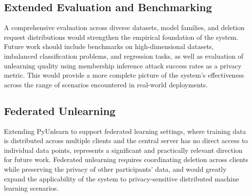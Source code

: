 \subsection{Extended Evaluation and Benchmarking}
A comprehensive evaluation across diverse datasets, model families, and deletion request distributions would strengthen the empirical foundation of the system. Future work should include benchmarks on high-dimensional datasets, imbalanced classification problems, and regression tasks, as well as evaluation of unlearning quality using membership inference attack success rates \cite{shokri2017membership} as a privacy metric. This would provide a more complete picture of the system's effectiveness across the range of scenarios encountered in real-world deployments.

\subsection{Federated Unlearning}
Extending PyUnlearn to support federated learning settings, where training data is distributed across multiple clients and the central server has no direct access to individual data points, represents a significant and practically relevant direction for future work. Federated unlearning requires coordinating deletion across clients while preserving the privacy of other participants' data, and would greatly expand the applicability of the system to privacy-sensitive distributed machine learning scenarios.
